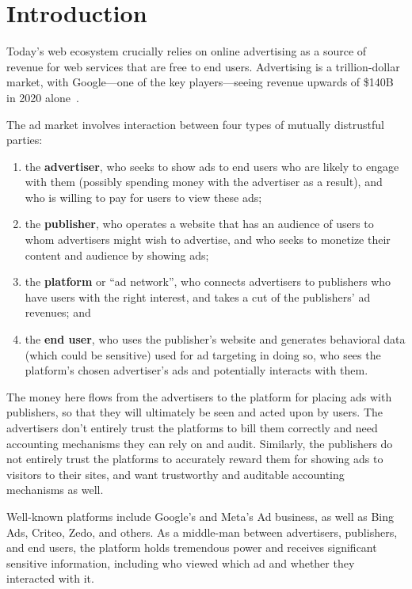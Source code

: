 \section{Introduction}
\label{s:overview}


Today's web ecosystem crucially relies on online advertising as a source of
revenue for web services that are free to end users.
%
Advertising is a trillion-dollar market, with Google---one of the key
players---seeing revenue upwards of \$140B in 2020 alone~\cite{xxx}.
%

The ad market involves interaction between four types of mutually distrustful parties:
\begin{enumerate}
 \item the \textbf{advertiser}, who seeks to show ads to end users who
   are likely to engage with them (possibly spending money with the
   advertiser as a result), and who is willing to pay for users to view
   these ads;
 \item the \textbf{publisher}, who operates a website that has an audience
   of users to whom advertisers might wish to advertise, and who seeks
   to monetize their content and audience by showing ads;
 \item the \textbf{platform} or ``ad network'', who connects advertisers
   to publishers who have users with the right interest, and takes a cut
   of the publishers' ad revenues; and
 \item the \textbf{end user}, who uses the publisher's website and generates
   behavioral data (which could be sensitive) used for ad targeting in doing so,
   who sees the platform's chosen advertiser's ads and potentially interacts
   with them.
\end{enumerate}
%
The money here flows from the advertisers to the platform for placing ads with publishers, so that they will ultimately be seen and acted upon by users.
%
The advertisers don't entirely trust the platforms to bill them correctly and need accounting mechanisms they can rely on and audit.
%
Similarly, the publishers do not entirely trust the platforms to accurately reward them for showing ads to visitors to their sites, and want trustworthy and auditable accounting mechanisms as well.

%
Well-known platforms include Google's and Meta's Ad business, as well
as Bing Ads, Criteo, Zedo, and others.
%
As a middle-man between advertisers, publishers, and end users, the platform
holds tremendous power and receives significant sensitive information, including
who viewed which ad and whether they interacted with it.
%
%
%

